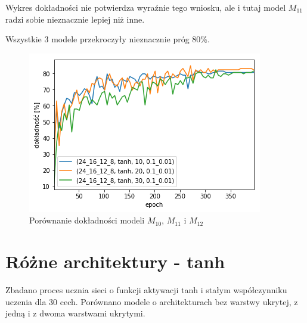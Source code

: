 \documentclass{report}
\begin{document}
    Wykres dokładności nie potwierdza wyraźnie tego wniosku, ale i tutaj model $M_{11}$ radzi sobie nieznacznie lepiej niż inne.

    Wszystkie 3 modele przekroczyły nieznacznie próg 80\%.

    \begin{figure}[htp]
        \centering
        \includegraphics[scale=0.8]{././img/feat-accuracy-tanh.png}
        \caption{Porównanie dokładności modeli $M_{10}$, $M_{11}$ i $M_{12}$}
    \end{figure}

    \section{Różne architektury - tanh}\label{sec:różneArchitektury-Tanh}

    Zbadano proces ucznia sieci o funkcji aktywacji tanh i stałym współczynniku uczenia dla 30 cech.
    Porównano modele o architekturach bez warstwy ukrytej, z jedną i z dwoma warstwami ukrytymi.
\end{document}
